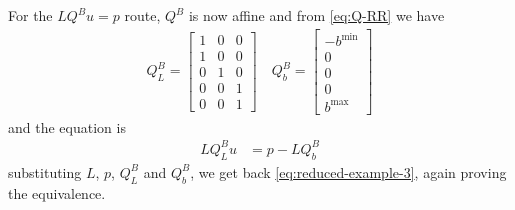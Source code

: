 \documentclass[11pt]{article}
\begin{document}
For the $LQ^Bu = p$ route, $Q^B$ is now affine and from \cref{eq:Q-RR} we have
\begin{align}
	Q^B_L = \begin{bmatrix}
		1 & 0 & 0 \\
		1 & 0 & 0 \\
		0 & 1 & 0 \\
		0 & 0 & 1 \\
		0 & 0 & 1
	\end{bmatrix}\quad
	Q^B_b = \begin{bmatrix}
		-b^{\min}\\0\\0\\0\\b^{\max}
	\end{bmatrix}
\end{align}
and the equation is
\begin{align}
	LQ^B_Lu &= p - LQ^B_b
\end{align}
substituting $L$, $p$, $Q^B_L$ and $Q^B_b$, we get back \cref{eq:reduced-example-3}, again proving the equivalence.
\end{document}
